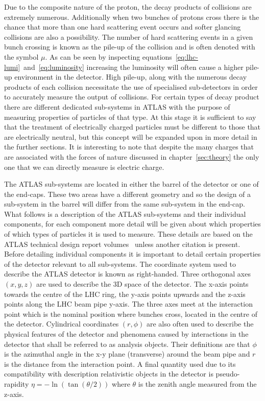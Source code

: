 Due to the composite nature of the proton, the decay products of collisions are
extremely numerous. Additionally when two bunches of protons cross there is the
chance that more than one hard scattering event occurs and softer glancing
collisions are also a possibility. The number of hard scattering events in a
given bunch crossing is known as the pile-up of the collision and is often
denoted with the symbol $\mu$. As can be seen by inspecting
equations~\ref{eq:lhc-lumi}~and~\ref{eq:luminosity} increasing the luminosity
will often cause a higher pile-up environment in the detector. High pile-up,
along with the numerous decay products of each collision necessitate the use of
specialised sub-detectors in order to accurately measure the output of
collisions. For certain types of decay product there are different dedicated
sub-systems in ATLAS with the purpose of measuring properties of particles of
that type. At this stage it is sufficient to say that the treatment of
electrically charged particles must be different to those that are electrically
neutral, but this concept will be expanded upon in more detail in the further
sections. It is interesting to note that despite the many charges that are
associated with the forces of nature discussed in chapter~\ref{sec:theory} the
only one that we can directly measure is electric charge.%

The ATLAS sub-systems are located in either the barrel of the detector or one of
the end-caps. These two areas have a different geometry and so the design of a
sub-system in the barrel will differ from the same sub-system in the end-cap.
What follows is a description of the ATLAS sub-systems and their individual
components, for each component more detail will be given about which properties
of which types of particles it is used to measure. These details are based on
the ATLAS technical design report volumes~\cite{ATLAS-TDR-01, ATLAS-TDR-02}
unless another citation is present. Before detailing individual components it is
important to detail certain properties of the detector relevant to all
sub-systems.  The coordinate system used to describe the ATLAS detector is known
as right-handed. Three orthogonal axes $(x, y, z)$ are used to describe the 3D
space of the detector. The x-axis points towards the centre of the LHC ring, the
y-axis points upwards and the z-axis points along the LHC beam pipe y-axis. The
three axes meet at the interaction point which is the nominal position where
bunches cross, located in the centre of the detector. Cylindrical coordinates
$(r, \phi)$ are also often used to describe the physical features of the
detector and phenomena caused by interactions in the detector that shall be
referred to as analysis objects. Their definitions are that $\phi$ is the
azimuthal angle in the x-y plane (transverse) around the beam pipe and $r$ is
the distance from the interaction point. A final quantity used due to its
compatibility with description relativistic objects in the detector is
pseudo-rapidity $\eta = - \ln(\tan(\theta / 2))$ where $\theta$ is the zenith
angle measured from the z-axis.

